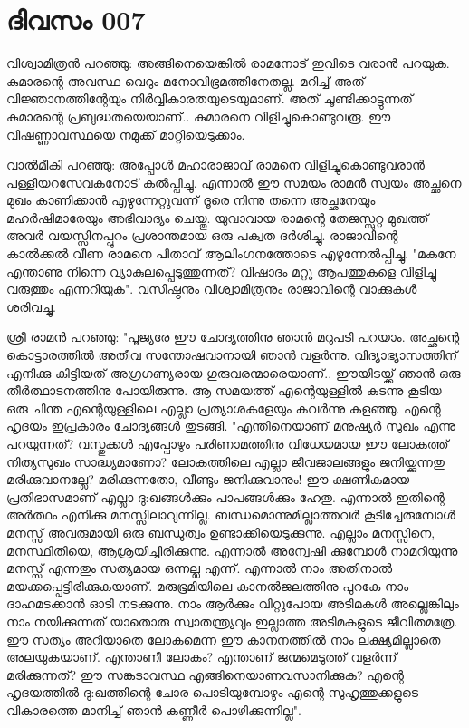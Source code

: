  
\section{ദിവസം 007}


വിശ്വാമിത്രന്‍ പറഞ്ഞു: അങ്ങിനെയെങ്കില്‍ രാമനോട്‌ ഇവിടെ വരാന്‍ പറയുക. കുമാരന്റെ അവസ്ഥ വെറും മനോവിഭ്രമത്തിനേതല്ല. മറിച്ച്‌ അത്‌ വിജ്ഞാനത്തിന്റേയും നിര്‍വ്വികാരതയുടെയുമാണ്‌. അത്‌ ചൂണ്ടിക്കാട്ടുന്നത്‌ കുമാരന്റെ പ്രബുദ്ധതയെയാണ്‌.. കുമാരനെ വിളിച്ചുകൊണ്ടുവരൂ. ഈ വിഷണ്ണാവസ്ഥയെ നമുക്ക്‌ മാറ്റിയെടുക്കാം.

വാല്‍മീകി പറഞ്ഞു: അപ്പോള്‍ മഹാരാജാവ്‌ രാമനെ വിളിച്ചുകൊണ്ടുവരാന്‍ പള്ളിയറസേവകനോട്‌ കല്‍പ്പിച്ചു. എന്നാല്‍ ഈ സമയം രാമന്‍ സ്വയം അച്ഛനെ മുഖം കാണിക്കാന്‍ എഴുന്നേറ്റുവന്ന് ദൂരെ നിന്നു തന്നെ അച്ഛനേയും മഹര്‍ഷിമാരേയും അഭിവാദ്യം ചെയ്തു. യുവാവായ രാമന്റെ തേജസ്സുറ്റ മുഖത്ത്‌ അവര്‍ വയസ്സിനപ്പുറം പ്രശാന്തമായ ഒരു പക്വത ദര്‍ശിച്ചു. രാജാവിന്റെ കാല്‍ക്കല്‍ വീണ രാമനെ പിതാവ്‌ ആലിംഗനത്തോടെ എഴുന്നേല്‍പ്പിച്ചു. "മകനേ എന്താണു നിന്നെ വ്യാകുലപ്പെടുത്തുന്നത്‌? വിഷാദം മറ്റു ആപത്തുകളെ വിളിച്ചു വരുത്തും എന്നറിയുക". വസിഷ്ഠനും വിശ്വാമിത്രനും രാജാവിന്റെ വാക്കുകള്‍ ശരിവച്ചു.

ശ്രീ രാമന്‍ പറഞ്ഞു: "പൂജ്യരേ ഈ ചോദ്യത്തിനു ഞാന്‍ മറുപടി പറയാം. അച്ഛന്റെ കൊട്ടാരത്തില്‍ അതീവ സന്തോഷവാനായി ഞാന്‍ വളര്‍ന്നു. വിദ്യാഭ്യാസത്തിന്‌ എനിക്കു കിട്ടിയത്‌ അഗ്രഗണ്യരായ ഗുരുവരന്മാരെയാണ്‌.. ഈയിടയ്ക്ക്‌ ഞാന്‍ ഒരു തീര്‍ത്ഥാടനത്തിനു പോയിരുന്നു. ആ സമയത്ത്‌ എന്റെയുള്ളില്‍ കടന്നു കൂടിയ ഒരു ചിന്ത എന്റെയുള്ളിലെ എല്ലാ പ്രത്യാശകളേയും കവര്‍ന്നു കളഞ്ഞു. എന്റെ ഹൃദയം ഇപ്രകാരം ചോദ്യങ്ങള്‍ തുടങ്ങി. "എന്തിനെയാണ്‌ മനുഷ്യര്‍ സുഖം എന്നു പറയുന്നത്‌? വസ്തുക്കള്‍ എപ്പോഴും പരിണാമത്തിനു വിധേയമായ ഈ ലോകത്ത്‌ നിത്യസുഖം സാദ്ധ്യമാണോ? ലോകത്തിലെ എല്ലാ ജീവജാലങ്ങളും ജനിയ്ക്കുന്നതു മരിക്കുവാനല്ലേ? മരിക്കുന്നതോ, വീണ്ടും ജനിക്കുവാനും! ഈ ക്ഷണികമായ പ്രതിഭാസമാണ്‌ എല്ലാ ദു:ഖങ്ങള്‍ക്കും പാപങ്ങള്‍ക്കും ഹേതു. എന്നാല്‍ ഇതിന്റെ അര്‍ത്ഥം എനിക്കു മനസ്സിലാവുന്നില്ല. ബന്ധമൊന്നുമില്ലാത്തവര്‍ കൂടിച്ചേരുമ്പോള്‍ മനസ്സ്‌ അവരുമായി ഒരു ബന്ധുത്വം ഉണ്ടാക്കിയെടുക്കുന്നു. എല്ലാം മനസ്സിനെ, മനസ്ഥിതിയെ, ആശ്രയിച്ചിരിക്കുന്നു. എന്നാല്‍ അന്വേഷി ക്കുമ്പോള്‍ നാമറിയുന്നു മനസ്സ്‌ എന്നതും സത്യമായ ഒന്നല്ല എന്ന്. എന്നാല്‍ നാം അതിനാല്‍ മയക്കപ്പെട്ടിരിക്കുകയാണ്‌. മരുഭൂമിയിലെ കാനല്‍ജലത്തിനു പുറകേ നാം ദാഹമടക്കാന്‍ ഓടി നടക്കുന്നു. നാം ആര്‍ക്കും വിറ്റുപോയ അടിമകള്‍ അല്ലെങ്കിലും നാം നയിക്കുന്നത്‌ യാതൊരു സ്വാതന്ത്ര്യവും ഇല്ലാത്ത അടിമകളുടെ ജീവിതമത്രേ. ഈ സത്യം അറിയാതെ ലോകമെന്ന ഈ കാനനത്തില്‍ നാം ലക്ഷ്യമില്ലാതെ അലയുകയാണ്‌. എന്താണീ ലോകം? എന്താണ്‌ ജന്മമെടുത്ത്‌ വളര്‍ന്ന് മരിക്കുന്നത്‌? ഈ സങ്കടാവസ്ഥ എങ്ങിനെയാണവസാനിക്കുക? എന്റെ ഹൃദയത്തില്‍ ദു:ഖത്തിന്റെ ചോര പൊടിയുമ്പോഴും എന്റെ സുഹൃത്തുക്കളുടെ വികാരത്തെ മാനിച്ച്‌ ഞാന്‍ കണ്ണീര്‍ പൊഴിക്കുന്നില്ല".
